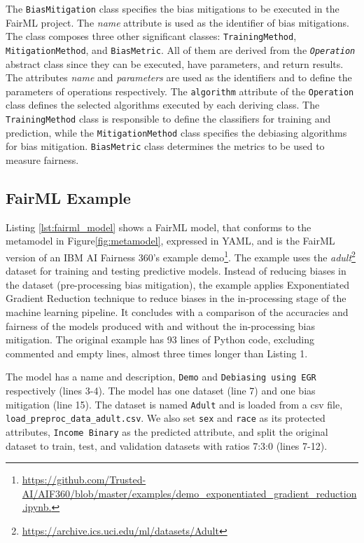 \documentclass[sigconf,review]{acmart}
\begin{document}
{		The \texttt{BiasMitigation} class specifies the bias mitigations to be executed in the FairML project. The \textit{name} attribute is used as the identifier of bias mitigations. The class composes three other significant classes: \texttt{TrainingMethod}, \texttt{MitigationMethod}, and \texttt{BiasMetric}. All of them are derived from the \texttt{\textit{Operation}} abstract class since they can be executed, have parameters, and return results. The attributes \textit{name} and \textit{parameters} are used as the identifiers and to define the parameters of operations respectively. The \texttt{algorithm} attribute of the \texttt{Operation} class defines the selected algorithms executed by each deriving class. The \texttt{TrainingMethod} class is responsible to define the classifiers for training and prediction, while the \texttt{MitigationMethod} class specifies the debiasing algorithms for bias mitigation. \texttt{BiasMetric} class determines the metrics to be used to measure fairness. 
		
		\subsection{FairML Example}
		\label{sec:fairml_example}	
		Listing \ref{lst:fairml_model} shows a FairML model, that conforms to the metamodel in Figure\ref{fig:metamodel}, expressed in YAML, and is the FairML version of an IBM AI Fairness 360's example demo\footnote{\url{https://github.com/Trusted-AI/AIF360/blob/master/examples/demo_exponentiated_gradient_reduction.ipynb.}}. 	
		The example uses the \textit{adult}\footnote{\url{https://archive.ics.uci.edu/ml/datasets/Adult}} dataset for training and testing predictive models. Instead of reducing biases in the dataset (pre-processing bias mitigation), the example applies Exponentiated Gradient Reduction technique to reduce biases in the in-processing stage of the machine learning pipeline. It concludes with a comparison of the accuracies and fairness of the models produced with and without the in-processing bias mitigation. The original example has 93 lines of Python code, excluding commented and empty lines, almost three times longer than Listing 1.
		
		The model has a name and description, \texttt{Demo} and \texttt{Debiasing using EGR} respectively (lines 3-4). The model has one dataset (line 7) and one bias mitigation (line 15). The dataset is named \texttt{Adult} and is loaded from a csv file, \texttt{load\_preproc\_data\_adult.csv}. We also set \texttt{sex} and \texttt{race} as its protected attributes, \texttt{Income Binary} as the predicted attribute, and split the original dataset to train, test, and validation datasets with ratios 7:3:0 (lines 7-12). 
		
}
\end{document}
